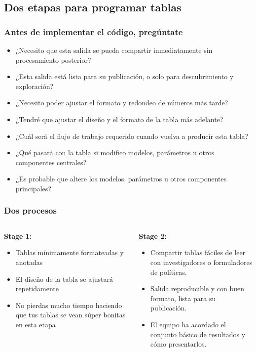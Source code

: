 \documentclass[10pt, aspectratio=169, compress]{beamer}
\begin{document}
\subsection{Dos etapas para programar tablas}
\begin{frame}[t]
	\frametitle{Antes de implementar el código, pregúntate}

	\begin{itemize}[<+->]
		\item ¿Necesito que esta salida se pueda compartir inmediatamente sin procesamiento posterior?
		\item ¿Esta salida está lista para su publicación, o solo para descubrimiento y exploración?
		\item ¿Necesito poder ajustar el formato y redondeo de números más tarde?
		\item ¿Tendré que ajustar el diseño y el formato de la tabla más adelante?
		\item ¿Cuál será el flujo de trabajo requerido cuando vuelva a producir esta tabla?
		\item ¿Qué pasará con la tabla si modifico modelos, parámetros u otros componentes centrales?
		\item ¿Es probable que altere los modelos, parámetros u otros componentes principales?
	\end{itemize}
\end{frame}
\begin{frame}
	\frametitle{Dos procesos}

	\begin{columns}
		\begin{column}[t]{0.5\textwidth}
			\textbf{Stage 1:} 
			\begin{itemize}
				\item Tablas mínimamente formateadas y anotadas
				\item El diseño de la tabla se ajustará repetidamente
				\item No pierdas mucho tiempo haciendo que tus tablas se vean súper bonitas en esta etapa
			\end{itemize}
		\end{column}
		\begin{column}[t]{0.5\textwidth}  %
			\textbf{Stage 2:} 
			\begin{itemize}
				\item Compartir tablas fáciles de leer con investigadores o formuladores de políticas.
				\item Salida reproducible y con buen formato, lista para su publicación.
				\item El equipo ha acordado el conjunto básico de resultados y cómo presentarlos.
			\end{itemize}
		\end{column}
	\end{columns}

\end{frame}
\end{document}
